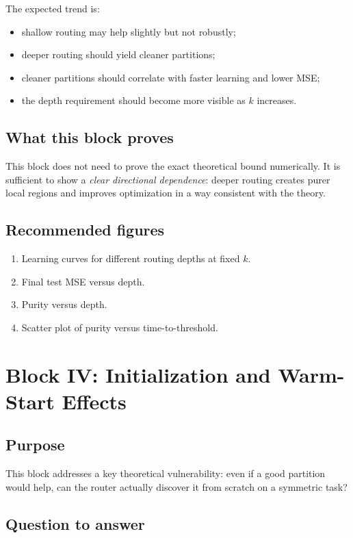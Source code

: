 \documentclass[11pt]{article}
\begin{document}
The expected trend is:
\begin{itemize}[leftmargin=2em]
    \item shallow routing may help slightly but not robustly;
    \item deeper routing should yield cleaner partitions;
    \item cleaner partitions should correlate with faster learning and lower MSE;
    \item the depth requirement should become more visible as $k$ increases.
\end{itemize}

\subsection{What this block proves}

This block does not need to prove the exact theoretical bound numerically. It is sufficient to show a \emph{clear directional dependence}: deeper routing creates purer local regions and improves optimization in a way consistent with the theory.

\subsection{Recommended figures}

\begin{enumerate}[leftmargin=2em]
    \item Learning curves for different routing depths at fixed $k$.
    \item Final test MSE versus depth.
    \item Purity versus depth.
    \item Scatter plot of purity versus time-to-threshold.
\end{enumerate}

\section{Block IV: Initialization and Warm-Start Effects}

\subsection{Purpose}

This block addresses a key theoretical vulnerability: even if a good partition would help, can the router actually discover it from scratch on a symmetric task?

\subsection{Question to answer}
\end{document}
